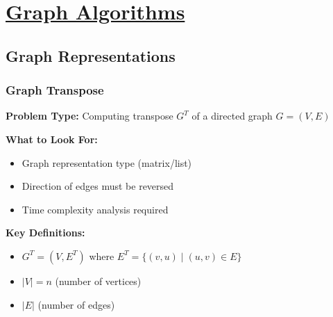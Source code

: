 \clearpage
\section{\texorpdfstring{\underline{Graph Algorithms}}{Graph Algorithms}}
\subsection{Graph Representations}
\subsubsection{Graph Transpose}
\textbf{Problem Type:} Computing transpose $G^T$ of a directed graph $G=(V,E)$

\textbf{What to Look For:}
\begin{itemize}[noitemsep,leftmargin=*]
    \item Graph representation type (matrix/list)
    \item Direction of edges must be reversed
    \item Time complexity analysis required
\end{itemize}

\textbf{Key Definitions:}
\begin{itemize}[noitemsep,leftmargin=*]
    \item $G^T = (V,E^T)$ where $E^T = \{(v,u) \mid (u,v) \in E\}$
    \item $|V| = n$ (number of vertices)
    \item $|E|$ (number of edges)
\end{itemize}

